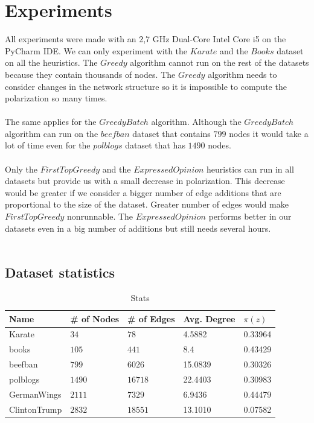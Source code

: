 \section{Experiments}
\label{sec:experim}

All experiments were made with an 2,7 GHz Dual-Core Intel Core i5 on the PyCharm IDE. We can only experiment with the $Karate$ and the $Books$ dataset on all the heuristics. The $Greedy$ algorithm cannot run on the rest of the datasets because they contain thousands of nodes. The $Greedy$ algorithm needs to consider changes in the network structure so it is impossible to compute the polarization so many times.
\\
\\ 
The same applies for the $GreedyBatch$ algorithm. Although the $GreedyBatch$ algorithm can run on the $beefban$ dataset that contains $799$ nodes it would take a lot of time even for the $polblogs$ dataset that has $1490$ nodes.
\\
\\
Only the $FirstTopGreedy$ and the $Expressed Opinion$ heuristics can run in all datasets but provide us with a small decrease in polarization. This decrease would be greater if we consider a bigger number of edge additions that are proportional to the size of the dataset. Greater number of edges would make $FirstTopGreedy$ nonrunnable. The $Expressed Opinion$ performs better in our datasets even in a big number of additions but still needs several hours. 
\\
\\
\clearpage

\subsection{Dataset statistics}

\begin{table}[H]
 \centering
 \caption{Stats}
 \label{tab:statistics}
 \begin{tabular}{| l || l | l | l | l |}
 \hline
  Name & \# of Nodes & \# of Edges & Avg. Degree & $\pi(z)$\\
  \hline
  \hline
  Karate & $34$ & $78$ & 4.5882 &  0.33964\\
  \hline
    books & $105$ & $441$ & 8.4 &  0.43429\\
  \hline
    beefban & $799$ & $6026$ & 15.0839 &  0.30326\\
  \hline
  polblogs & $1490$ & $16718$ & 22.4403 &  0.30983\\
  \hline
  GermanWings & $2111$ & $7329$ & 6.9436 &  0.44479\\
  \hline
  ClintonTrump & $2832$ & $18551$ & 13.1010 &  0.07582\\
  \hline
 \end{tabular}
 \end{table}
 
